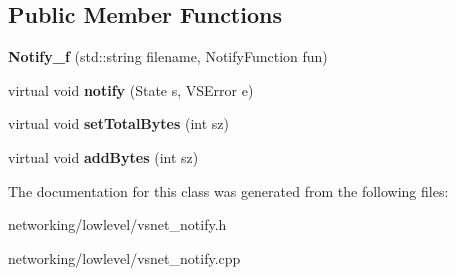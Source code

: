 \subsection*{Public Member Functions}
\begin{DoxyCompactItemize}
\item 
{\bfseries Notify\+\_\+f} (std\+::string filename, Notify\+Function fun)\hypertarget{classVsnetDownload_1_1Client_1_1Notify__f_ac0af5da32feba9594e9a10d0216992a6}{}\label{classVsnetDownload_1_1Client_1_1Notify__f_ac0af5da32feba9594e9a10d0216992a6}

\item 
virtual void {\bfseries notify} (State s, V\+S\+Error e)\hypertarget{classVsnetDownload_1_1Client_1_1Notify__f_a4eee7cf73cd072ff6841d032c74c5842}{}\label{classVsnetDownload_1_1Client_1_1Notify__f_a4eee7cf73cd072ff6841d032c74c5842}

\item 
virtual void {\bfseries set\+Total\+Bytes} (int sz)\hypertarget{classVsnetDownload_1_1Client_1_1Notify__f_a0a5c5c2215bad3d82365082c0d6044c4}{}\label{classVsnetDownload_1_1Client_1_1Notify__f_a0a5c5c2215bad3d82365082c0d6044c4}

\item 
virtual void {\bfseries add\+Bytes} (int sz)\hypertarget{classVsnetDownload_1_1Client_1_1Notify__f_a6d5342f6dca6c3860c671ab4b8b32e99}{}\label{classVsnetDownload_1_1Client_1_1Notify__f_a6d5342f6dca6c3860c671ab4b8b32e99}

\end{DoxyCompactItemize}


The documentation for this class was generated from the following files\+:\begin{DoxyCompactItemize}
\item 
networking/lowlevel/vsnet\+\_\+notify.\+h\item 
networking/lowlevel/vsnet\+\_\+notify.\+cpp\end{DoxyCompactItemize}
